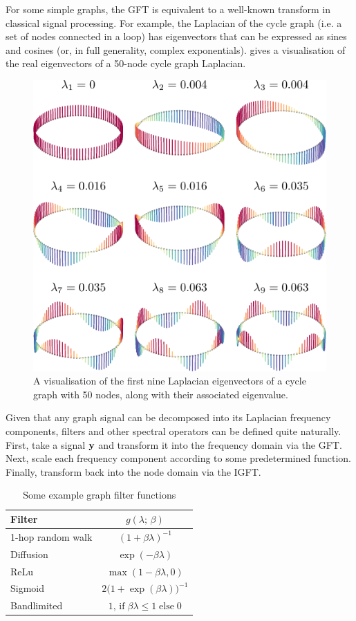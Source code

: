 For some simple graphs, the GFT is equivalent to a well-known transform in classical signal processing. For example, the Laplacian of the cycle graph (i.e. a set of nodes connected in a loop) has eigenvectors that can be expressed as sines and cosines (or, in full generality, complex exponentials).  gives a visualisation of the real eigenvectors of a 50-node cycle graph Laplacian. 

\begin{figure}[t]
	\centering
		\includegraphics[width=0.65\linewidth]{Figures/loop_plot.pdf}
        \caption[A visualisation of the real Laplacian eigenvectors of the cycle graph]{A visualisation of the first nine Laplacian eigenvectors of a cycle graph with 50 nodes, along with their associated eigenvalue.}
	\label{fig:cycle_eighs}
\end{figure}

Given that any graph signal can be decomposed into its Laplacian frequency components, filters and other spectral operators can be defined quite naturally. First, take a signal $\mathbf{y}$ and transform it into the frequency domain via the GFT. Next, scale each frequency component according to some predetermined function. Finally, transform back into the node domain via the IGFT. 


\begin{table}
    \centering
    \def\arraystretch{1.7}
    \begin{tabular}{@{}l c@{}}
        \toprule
        \textbf{Filter}   & $g(\lambda; \,\beta)$   \\
        \midrule
        1-hop random walk & $(1 + \beta \lambda)^{-1}$ \\
        Diffusion         & $\exp(-\beta \lambda)$\\
        ReLu              & $\max (1 - \beta \lambda, 0)$\\
        Sigmoid           & $2 \big( 1 + \exp(\beta \lambda)\big)^{-1}$\\
        Bandlimited       & $1, \,\text{if} \; \beta \lambda \leq 1 \; \text{else} \; 0$ \\
        \bottomrule
       \end{tabular}
       \caption[Example graph filter functions]{Some example graph filter functions}
        \label{tab:filters}
\end{table}

